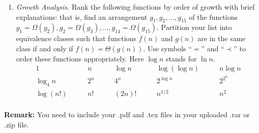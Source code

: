 \documentclass[12pt,a4paper]{article}
\makeatletter
\newtheorem*{solution}{Solution}
\theoremstyle{definition}
\renewenvironment{solution}[1][Solution] {\par\pushQED{\qed}\normalfont\topsep6\p@\@plus6\p@\relax\trivlist\item[\hskip\labelsep\bfseries#1\@addpunct{.}]\ignorespaces}{\popQED\endtrivlist\@endpefalse} \makeatother
\makeatother
\begin{document}
\begin{enumerate}
\item \textit{Growth Analysis.} Rank the following functions by order of growth with brief explanations: that is, find an arrangement $g_1, g_2, \ldots , g_{15}$ of the functions $g_1 = \Omega(g_2), g_2 = \Omega(g_3), \ldots, g_{14} = \Omega(g_{15})$.  Partition your list into equivalence classes such that functions $f(n)$ and $g(n)$ are in the same class if and only if $f(n) = \Theta(g(n))$. Use symbols ``$=$'' and ``$\prec$'' to order these functions appropriately. Here $\log n$ stands for $\ln n$.
$$
\begin{array}{ccccc}
	1 \quad & \quad n \quad & \quad \log n \quad & \quad \log (\log n) \quad & \quad n \log n \\
	\log_4 n \quad & \quad 2^n \quad & \quad 4^n \quad & \quad 2^{\log n} \quad & \quad 2^{2^n} \\
	\log (n!) \quad & \quad n! \quad & \quad (2n)! \quad & \quad  n^{1/2} \quad & \quad n^2 \\
\end{array}
$$


\end{enumerate}

\vspace{20pt}

\textbf{Remark:} You need to include your .pdf and .tex files in your uploaded .rar or .zip file.

\end{document}
